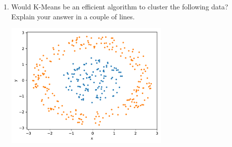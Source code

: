 \begin{Q}
\begin{enumerate}
 \item Would K-Means be an efficient algorithm to cluster the following data? Explain your answer in a couple of lines.
 \begin{center}
 \includegraphics[width=8cm]{figs/concentric.pdf}
 \end{center}

\end{enumerate}


\end{Q}
          